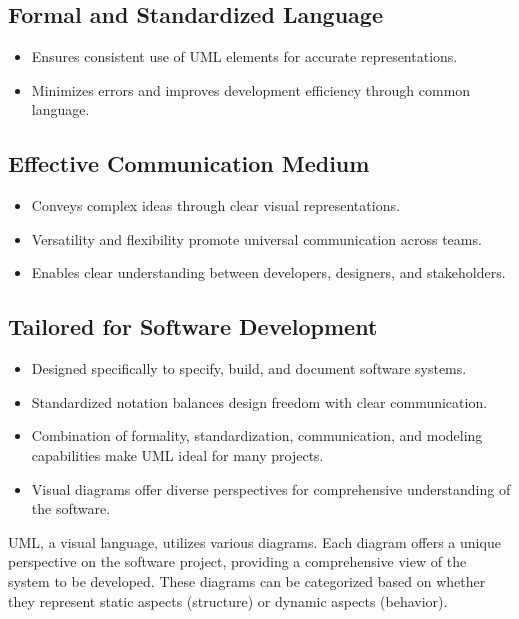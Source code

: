 \vspace{0.25cm}
\subsection*{Formal and Standardized Language}
\begin{itemize}
\renewcommand\labelitemi{\textbf{\Huge .}}
\item Ensures consistent use of UML elements for accurate representations.
\item Minimizes errors and improves development efficiency through common language.
\end{itemize}

\subsection*{Effective Communication Medium}
\begin{itemize}
\renewcommand\labelitemi{\textbf{\Huge .}}
\item Conveys complex ideas through clear visual representations.
\item Versatility and flexibility promote universal communication across teams.
\item Enables clear understanding between developers, designers, and stakeholders.
\end{itemize}

\subsection*{Tailored for Software Development}
\begin{itemize}
\renewcommand\labelitemi{\textbf{\Huge .}}
\item Designed specifically to specify, build, and document software systems.
\item Standardized notation balances design freedom with clear communication.
\item Combination of formality, standardization, communication, and modeling capabilities make UML ideal for many projects.
\item Visual diagrams offer diverse perspectives for comprehensive understanding of the software.
\end{itemize}
UML, a visual language, utilizes various diagrams. Each diagram offers a unique perspective on the software project, providing a comprehensive view of the system to be developed. These diagrams can be categorized based on whether they represent static aspects (structure) or dynamic aspects (behavior).


